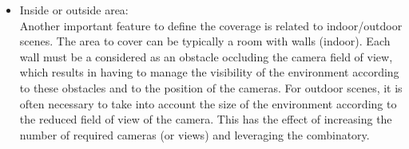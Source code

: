\begin{itemize}
\item Inside or outside area:\\ 
Another important feature to define the coverage is related to indoor/outdoor scenes. The area to cover can be typically a room with walls (indoor). Each wall must be a considered as an obstacle occluding the camera field of view,  which results in having to manage the visibility of the environment according to these obstacles and to the position of the cameras. For outdoor scenes, it is often necessary to take into account the size of the environment according to the reduced field of view of the camera. This has the effect of increasing the number of required cameras (or views) and leveraging the combinatory. 

   
\end{itemize}
  
